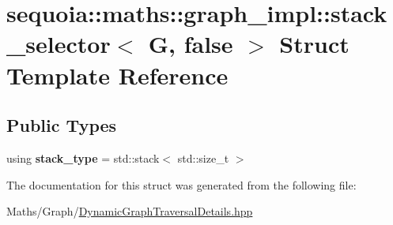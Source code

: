\hypertarget{structsequoia_1_1maths_1_1graph__impl_1_1stack__selector_3_01_g_00_01false_01_4}{}\section{sequoia\+::maths\+::graph\+\_\+impl\+::stack\+\_\+selector$<$ G, false $>$ Struct Template Reference}
\label{structsequoia_1_1maths_1_1graph__impl_1_1stack__selector_3_01_g_00_01false_01_4}
\subsection*{Public Types}
\begin{DoxyCompactItemize}
\item 
\mbox{\label{structsequoia_1_1maths_1_1graph__impl_1_1stack__selector_3_01_g_00_01false_01_4_a8bb0ec15e155d2815fafd8bd4706ad78}} 
using {\bfseries stack\+\_\+type} = std\+::stack$<$ std\+::size\+\_\+t $>$
\end{DoxyCompactItemize}


The documentation for this struct was generated from the following file\+:\begin{DoxyCompactItemize}
\item 
Maths/\+Graph/\mbox{\hyperlink{_dynamic_graph_traversal_details_8hpp}{Dynamic\+Graph\+Traversal\+Details.\+hpp}}\end{DoxyCompactItemize}
